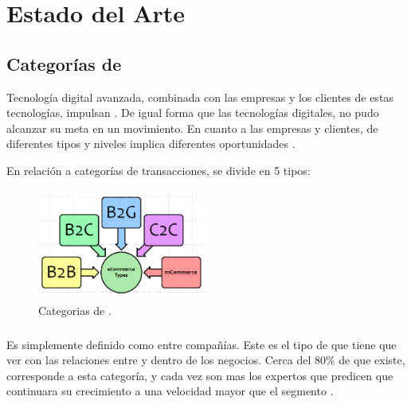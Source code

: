 \chapter{Estado del Arte}\label{cap:estadoArte}



%
%

\section{Categorías de \ecommerce}

Tecnología digital avanzada, combinada con las empresas y los clientes de estas tecnologías, impulsan \ecommerce. De igual forma que las tecnologías digitales, \ecommerce no pudo alcanzar su meta en un movimiento. En cuanto a las empresas y clientes, \ecommerce de diferentes tipos y niveles implica diferentes oportunidades \cite{zheng2009fundamentals}.

En relación a categorías de transacciones, \ecommerce se divide en 5 tipos:
\begin{figure}[h!]
	\centering
	\includegraphics[width=0.5\textwidth]{figuras/ecommerce_types.png}
	\caption{Categorias de \ecommerce.}
\end{figure}

\subsection{\btob}

Es simplemente definido como \ecommerce entre compañías. Este es el tipo de \ecommerce que tiene que ver con las relaciones entre y dentro de los negocios. Cerca del 80\% de \ecommerce que existe, corresponde a esta categoría, y cada vez son mas los expertos que predicen que \btob \ecommerce continuara su crecimiento a una velocidad mayor que el segmento \btoc.

